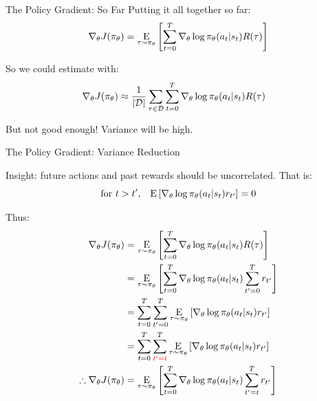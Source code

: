 \documentclass[9pt]{beamer}
\newcommand{\underE}[2]{\underset{\begin{subarray}{c}#1 \end{subarray}}{\E}\left[ #2 \right]}
\begin{document}
\begin{frame}{The Policy Gradient: So Far}
Putting it all together so far:
%
\begin{equation*}
\nabla_{\theta} J(\pi_{\theta}) = \underE{\tau \sim \pi_{\theta}}{\sum_{t=0}^T \nabla_{\theta} \log \pi_{\theta}(a_t | s_t) R(\tau)}
\end{equation*}

So we could estimate with:
%
\begin{align*}
\nabla_{\theta} J(\pi_{\theta}) &\approx \frac{1}{|{\mathcal D}|} \sum_{\tau \in{\mathcal D}} \sum_{t=0}^T \nabla_{\theta} \log \pi_{\theta}(a_t | s_t) R(\tau)
\end{align*}

But not good enough! Variance will be high.

\end{frame}

\begin{frame}{The Policy Gradient: Variance Reduction}

Insight: future actions and past rewards should be uncorrelated. That is:
%
\begin{equation*}
\text{for } t > t', \;\;\; {\mathrm E}\left[\nabla_{\theta} \log \pi_{\theta}(a_t | s_t) r_{t'}\right] = 0
\end{equation*}

Thus:
%
\begin{align*}
\nabla_{\theta} J(\pi_{\theta}) &= \underE{\tau \sim \pi_{\theta}}{\sum_{t=0}^T \nabla_{\theta} \log \pi_{\theta}(a_t | s_t) R(\tau)} \\
&= \underE{\tau \sim \pi_{\theta}}{\sum_{t=0}^T \nabla_{\theta} \log \pi_{\theta}(a_t | s_t) \sum_{t'=0}^T r_{t'}} \\
&= \sum_{t=0}^T \sum_{t'=0}^T \underE{\tau \sim \pi_{\theta}}{\nabla_{\theta} \log \pi_{\theta}(a_t | s_t)r_{t'}} \\
&= \sum_{t=0}^T \sum_{{\color{red}t'=t}}^T\underE{\tau \sim \pi_{\theta}}{\nabla_{\theta} \log \pi_{\theta}(a_t | s_t)r_{t'}} \\
\therefore \nabla_{\theta} J(\pi_{\theta}) &= \underE{\tau \sim \pi_{\theta}}{\sum_{t=0}^T \nabla_{\theta} \log \pi_{\theta}(a_t | s_t) \sum_{t'=t}^T r_{t'}} 
\end{align*}

\end{frame}
\end{document}
